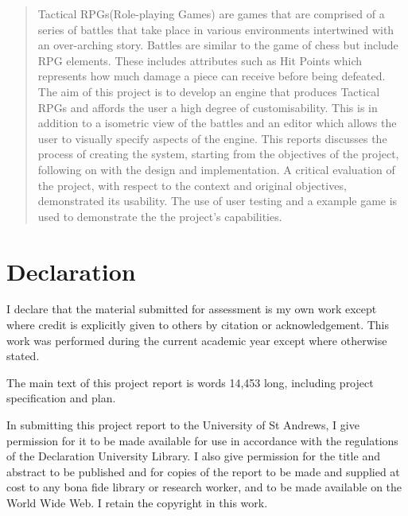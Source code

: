 
\begin{abstract}

Tactical RPGs(Role-playing Games) are games that are comprised of a series of battles that take place in various environments intertwined with an over-arching story. Battles are similar to the game of chess but include RPG elements. These includes attributes such as Hit Points which represents how much damage a piece can receive before being defeated.  The aim of this project is  to develop an engine that produces Tactical RPGs and affords the user a high degree of customisability. This is in addition to a isometric view of the battles and an editor which allows the user to visually specify aspects of the engine. This reports discusses the process of creating the system, starting from the objectives of the project, following on with the design and implementation.  A critical evaluation of the project, with respect to the context and original objectives, demonstrated its usability. The use of user testing and a example game is used to demonstrate the the project's capabilities.

\end{abstract}

\sectionfont{
	\sectionrule{0pt}{0pt}{-10pt}{0.8pt}
}

\section*{Declaration}
I declare that the material submitted for assessment is my own work except where credit is explicitly given to others by citation or acknowledgement. This work was performed during the current academic year except where otherwise stated.

The main text of this project report is words 14,453 long, including project specification and plan. 

In submitting this project report to the University of St Andrews, I give permission for it to be made available for use in accordance with the regulations of the Declaration University Library. I also give permission for the title and abstract to be published and for copies of the report to be made and supplied at cost to any bona fide library or research worker, and to be made available on the World Wide Web. I retain the copyright in this work.

